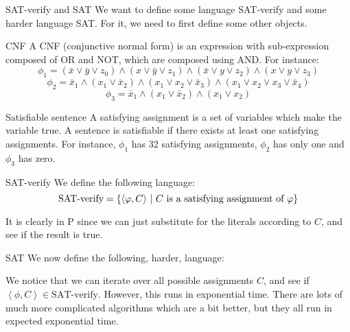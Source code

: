 \documentclass[a4paper]{article}
\begin{document}
\begin{parag}{SAT-verify and SAT}
    We want to define some language SAT-verify and some harder language SAT. For it, we need to first define some other objects.

    \begin{subparag}{CNF}
        A CNF (conjunctive normal form) is an expression with sub-expression composed of OR and NOT, which are composed using AND. For instance: 
        \[\phi_1 = \left(\bar{x} \lor \bar{y} \lor z_0\right) \land \left(x \lor \bar{y} \lor z_1\right) \land \left(\bar{x} \lor y \lor z_2\right) \land \left(x \lor y \lor z_3\right)\]
        \[\phi_2 = \bar{x}_1 \land \left(x_1 \lor \bar{x}_2\right) \land \left(x_1 \lor x_2 \lor \bar{x}_3\right) \land \left(x_1 \lor x_2 \lor x_3 \lor \bar{x}_4\right)\]
        \[\phi_3 = \bar{x}_1 \land \left(x_1 \lor \bar{x}_2\right) \land \left(x_1 \lor x_2\right)\]
    \end{subparag}
    
    \begin{subparag}{Satisfiable sentence}
        A satisfying assignment is a set of variables which make the variable true. A sentence is satisfiable if there exists at least one satisfying assignments. For instance, $\phi_1$ has 32 satisfying assignments, $\phi_2$ has only one and $\phi_3$ has zero.
    \end{subparag}
    
    \begin{subparag}{SAT-verify}
        We define the following language: 
        \[\text{SAT-verify} = \left\{\left\langle \phi, C \right\rangle \suchthat C \text{ is a satisfying assignment of $\phi$}\right\}\]
        
        It is clearly in P since we can just substitute for the literals according to $C$, and see if the result is true.
    \end{subparag}

    \begin{subparag}{SAT}
        We now define the following, harder, language: 
        
        We notice that we can iterate over all possible assignments $C$, and see if $\left\langle \phi, C \right\rangle \in \text{SAT-verify}$. However, this runs in exponential time. There are lots of much more complicated algorithms which are a bit better, but they all run in expected exponential time.
    \end{subparag}
\end{parag}
\end{document}

